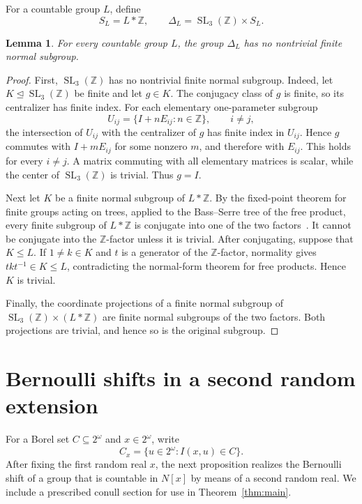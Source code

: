\documentclass[11pt]{amsart}
\newtheorem{lemma}[theorem]{Lemma}
\theoremstyle{definition}
\theoremstyle{remark}
\newcommand{\Z}{\mathbb Z}
\newcommand{\SL}{\operatorname{SL}}
\begin{document}
For a countable group $L$, define
\[
 S_L=L*\Z,
 \qquad
 \Delta_L=\SL_3(\Z)\times S_L.
\]

\begin{lemma}\label{lem:no-finite-normal}
For every countable group $L$, the group $\Delta_L$ has no nontrivial finite normal subgroup.
\end{lemma}

\begin{proof}
First, $\SL_3(\Z)$ has no nontrivial finite normal subgroup.  Indeed, let $K\trianglelefteq\SL_3(\Z)$ be finite and let $g\in K$.  The conjugacy class of $g$ is finite, so its centralizer has finite index.  For each elementary one-parameter subgroup
\[
 U_{ij}=\{I+nE_{ij}:n\in\Z\},\qquad i\neq j,
\]
the intersection of $U_{ij}$ with the centralizer of $g$ has finite index in $U_{ij}$.  Hence $g$ commutes with $I+mE_{ij}$ for some nonzero $m$, and therefore with $E_{ij}$.  This holds for every $i\neq j$.  A matrix commuting with all elementary matrices is scalar, while the center of $\SL_3(\Z)$ is trivial.  Thus $g=I$.

Next let $K$ be a finite normal subgroup of $L*\Z$.  By the fixed-point theorem for finite groups acting on trees, applied to the Bass--Serre tree of the free product, every finite subgroup of $L*\Z$ is conjugate into one of the two factors~\cite[I.6.5]{Serre}.  It cannot be conjugate into the $\Z$-factor unless it is trivial.  After conjugating, suppose that $K\leq L$.  If $1\neq k\in K$ and $t$ is a generator of the $\Z$-factor, normality gives $tkt^{-1}\in K\leq L$, contradicting the normal-form theorem for free products.  Hence $K$ is trivial.

Finally, the coordinate projections of a finite normal subgroup of
$\SL_3(\Z)\times(L*\Z)$ are finite normal subgroups of the two factors.  Both projections are trivial, and hence so is the original subgroup.
\end{proof}

\section{Bernoulli shifts in a second random extension}

For a Borel set $C\subseteq2^\omega$ and $x\in2^\omega$, write
\[
 C_x=\{u\in2^\omega:I(x,u)\in C\}.
\]
After fixing the first random real $x$, the next proposition realizes the Bernoulli shift of a group that is countable in $N[x]$ by means of a second random real.  We include a prescribed conull section for use in Theorem~\ref{thm:main}.
\end{document}
